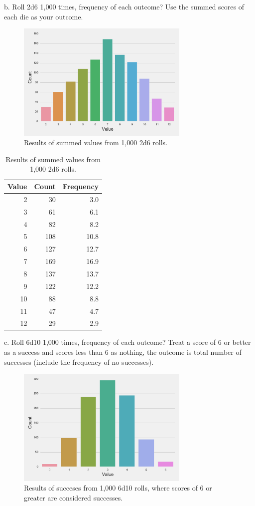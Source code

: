 \documentclass[twocolumn,letterpaper]{article}  %
\begin{document}
b. Roll 2d6 1,000 times, frequency of each outcome? Use the summed scores of each die as your outcome.
\begin{figure}%
\centering
\includegraphics[width=3.25in]{2d6.pdf}
\caption{Results of summed values from 1,000 2d6 rolls.}
\end{figure}

\begin{table}%
\begin{center}
\begin{tabular}{*{3}{r}}
\toprule
Value & Count & Frequency \\
\midrule
 2   &  30      &  3.0 \\
 3   &  61      &  6.1 \\
 4   &  82      &  8.2 \\
 5   & 108      & 10.8 \\
 6   & 127      & 12.7 \\
 7   & 169      & 16.9 \\
 8   & 137      & 13.7 \\
 9   & 122      & 12.2 \\
10   &  88      &  8.8 \\
11   &  47      &  4.7 \\
12   &  29      &  2.9 \\
\bottomrule
\end{tabular}
\end{center}
\caption{Results of summed values from 1,000 2d6 rolls.}
\end{table}

c. Roll 6d10 1,000 times, frequency of each outcome? Treat a score of 6 or better as a success and scores less than 6 as nothing, the outcome is total number of successes (include the frequency of no successes).
\begin{figure}%
\centering
\includegraphics[width=3.25in]{6d10>6.pdf}
\caption{Results of succeses from 1,000 6d10 rolls, where scores of 6 or greater are considered successes.}
\end{figure}
\end{document}
